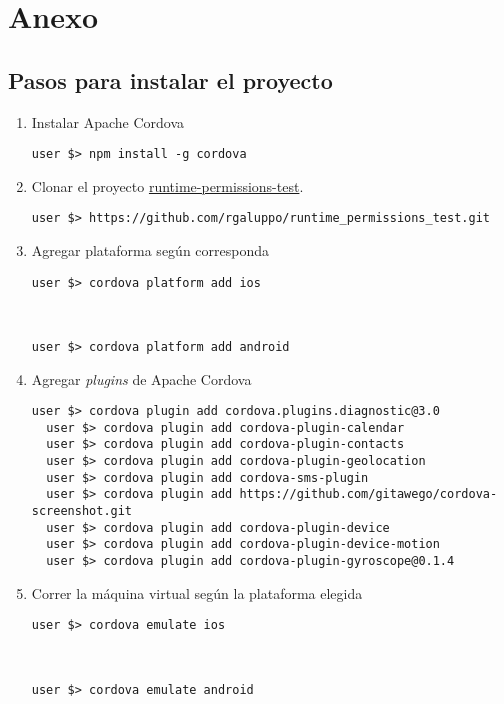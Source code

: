 \chapter*{Anexo}
\section*{Pasos para instalar el proyecto}
\begin{enumerate}
    \item Instalar Apache Cordova
        \begin{lstlisting}[style=DOS]
  user $> npm install -g cordova
        \end{lstlisting}
    \item Clonar el proyecto \href{https://github.com/rgaluppo/runtime_permissions_test}{runtime-permissions-test}.
    \begin{lstlisting}[style=DOS]
  user $> https://github.com/rgaluppo/runtime_permissions_test.git
  \end{lstlisting}
    \item Agregar plataforma según corresponda
        \begin{lstlisting}[style=DOS]
  user $> cordova platform add ios
        \end{lstlisting}\\
        \begin{lstlisting}[style=DOS]
  user $> cordova platform add android
        \end{lstlisting}
    \item Agregar \emph{plugins} de Apache Cordova
        \begin{lstlisting}[style=DOS]
  user $> cordova plugin add cordova.plugins.diagnostic@3.0
  user $> cordova plugin add cordova-plugin-calendar
  user $> cordova plugin add cordova-plugin-contacts
  user $> cordova plugin add cordova-plugin-geolocation
  user $> cordova plugin add cordova-sms-plugin
  user $> cordova plugin add https://github.com/gitawego/cordova-screenshot.git
  user $> cordova plugin add cordova-plugin-device
  user $> cordova plugin add cordova-plugin-device-motion
  user $> cordova plugin add cordova-plugin-gyroscope@0.1.4
        \end{lstlisting}
    \item Correr la máquina virtual según la plataforma elegida
        \begin{lstlisting}[style=DOS]
  user $> cordova emulate ios
        \end{lstlisting}\\
        \begin{lstlisting}[style=DOS]
  user $> cordova emulate android
        \end{lstlisting}
\end{enumerate}
